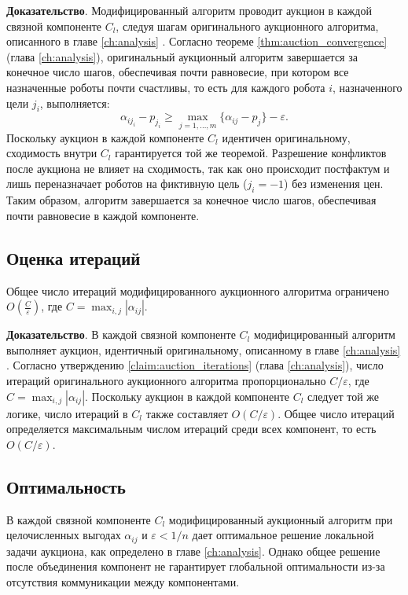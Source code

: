 \textbf{Доказательство}. 
Модифицированный алгоритм проводит аукцион в каждой связной компоненте \( C_l \), следуя шагам оригинального аукционного алгоритма, описанного в главе \ref{ch:analysis} \cite{bertsekas1990}. Согласно теореме \ref{thm:auction_convergence} (глава \ref{ch:analysis}), оригинальный аукционный алгоритм завершается за конечное число шагов, обеспечивая почти равновесие, при котором все назначенные роботы почти счастливы, то есть для каждого робота \( i \), назначенного цели \( j_i \), выполняется:
\[
\alpha_{i j_i} - p_{j_i} \geq \max_{j=1,\ldots,m} \{\alpha_{ij} - p_j\} - \varepsilon.
\]
Поскольку аукцион в каждой компоненте \( C_l \) идентичен оригинальному, сходимость внутри \( C_l \) гарантируется той же теоремой. Разрешение конфликтов после аукциона не влияет на сходимость, так как оно происходит постфактум и лишь переназначает роботов на фиктивную цель (\( j_i = -1 \)) без изменения цен. Таким образом, алгоритм завершается за конечное число шагов, обеспечивая почти равновесие в каждой компоненте.

\subsection{Оценка итераций}

\begin{claim}
\label{claim:mod_auction_iterations}
Общее число итераций модифицированного аукционного алгоритма ограничено \( O\left( \frac{C}{\varepsilon} \right) \), где \( C = \max_{i,j} |\alpha_{ij}| \).
\end{claim}

\textbf{Доказательство}. 
В каждой связной компоненте \( C_l \) модифицированный алгоритм выполняет аукцион, идентичный оригинальному, описанному в главе \ref{ch:analysis} \cite{bertsekas1990}. Согласно утверждению \ref{claim:auction_iterations} (глава \ref{ch:analysis}), число итераций оригинального аукционного алгоритма пропорционально \( C / \varepsilon \), где \( C = \max_{i,j} |\alpha_{ij}| \). Поскольку аукцион в каждой компоненте \( C_l \) следует той же логике, число итераций в \( C_l \) также составляет \( O(C / \varepsilon) \). Общее число итераций определяется максимальным числом итераций среди всех компонент, то есть \( O(C / \varepsilon) \).

\subsection{Оптимальность}

\begin{theorem}
\label{thm:mod_auction_optimality}
В каждой связной компоненте \( C_l \) модифицированный аукционный алгоритм при целочисленных выгодах \( \alpha_{ij} \) и \( \varepsilon < 1/n \) дает оптимальное решение локальной задачи аукциона, как определено в главе \ref{ch:analysis}. Однако общее решение после объединения компонент не гарантирует глобальной оптимальности из-за отсутствия коммуникации между компонентами.
\end{theorem}

